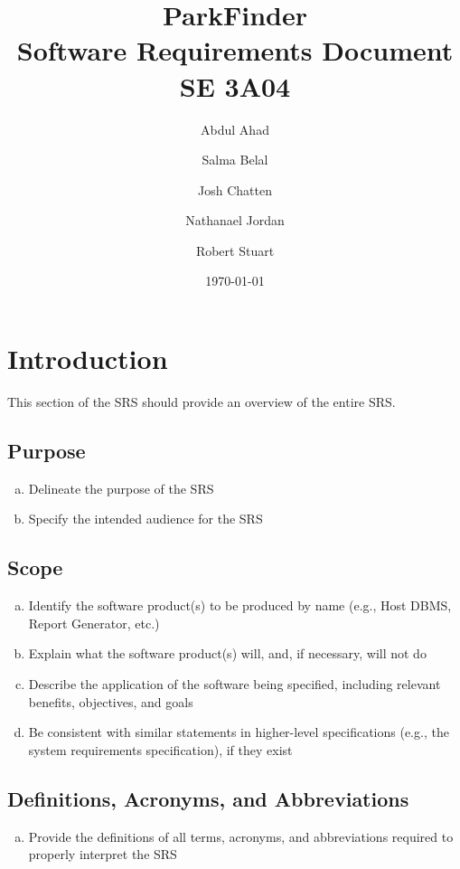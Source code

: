 \documentclass[]{article}
\title{ParkFinder\\Software Requirements Document\\SE 3A04}
\author{Abdul Ahad \and Salma Belal \and Josh Chatten \and Nathanael Jordan \and Robert Stuart}
\date{\today}
\begin{document}
\maketitle	

\section{Introduction}%
\label{sec:introduction}

This section of the SRS should provide an overview of the entire SRS.

\subsection{Purpose}%
\label{sub:purpose}
\begin{enumerate}[a)]
	\item Delineate the purpose of the SRS
	\item Specify the intended audience for the SRS
\end{enumerate}

\subsection{Scope}%
\label{sub:scope}
\begin{enumerate}[a)]
    \item Identify the software product(s) to be produced by name (e.g., Host DBMS, Report
    Generator, etc.)
	\item Explain what the software product(s) will, and, if necessary, will not do
	\item Describe the application of the software being specified, including relevant benefits,
	objectives, and goals
	\item Be consistent with similar statements in higher-level specifications (e.g., the system
	requirements specification), if they exist 
\end{enumerate}

\subsection{Definitions, Acronyms, and Abbreviations}%
\label{sub:definitions_acronyms_and_abbreviations}
\begin{enumerate}[a)]
	\item Provide the definitions of all terms, acronyms, and abbreviations required to properly
	interpret the SRS
\end{enumerate}
\end{document}
